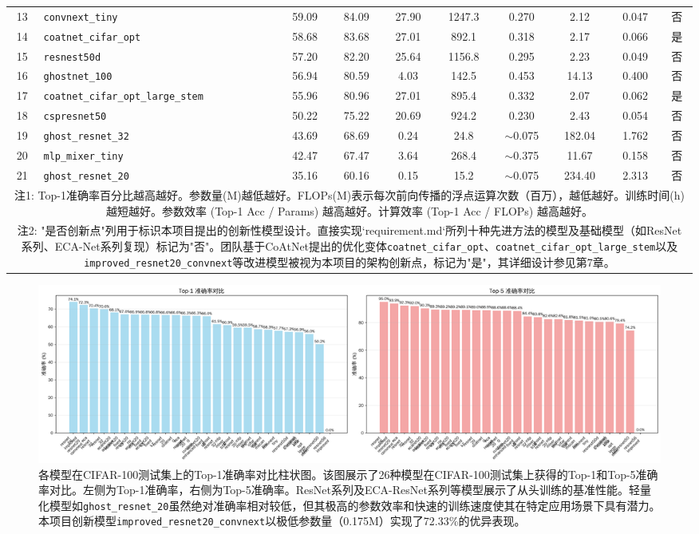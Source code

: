 \documentclass[a4paper]{article}
\begin{document}
\begin{description}
\begin{longtable}{clcccccccc}
13 & \texttt{convnext\_tiny} & 59.09 & 84.09 & 27.90 & 1247.3 & 0.270 & 2.12 & 0.047 & 否 \\
14 & \texttt{coatnet\_cifar\_opt} & 58.68 & 83.68 & 27.01 & 892.1 & 0.318 & 2.17 & 0.066 & 是 \\
15 & \texttt{resnest50d} & 57.20 & 82.20 & 25.64 & 1156.8 & 0.295 & 2.23 & 0.049 & 否 \\
16 & \texttt{ghostnet\_100} & 56.94 & 80.59 & 4.03 & 142.5 & 0.453 & 14.13 & 0.400 & 否 \\
17 & \texttt{coatnet\_cifar\_opt\_large\_stem} & 55.96 & 80.96 & 27.01 & 895.4 & 0.332 & 2.07 & 0.062 & 是 \\
18 & \texttt{cspresnet50} & 50.22 & 75.22 & 20.69 & 924.2 & 0.230 & 2.43 & 0.054 & 否 \\
19 & \texttt{ghost\_resnet\_32} & 43.69 & 68.69 & 0.24 & 24.8 & $\sim$0.075 & 182.04 & 1.762 & 否 \\
20 & \texttt{mlp\_mixer\_tiny} & 42.47 & 67.47 & 3.64 & 268.4 & $\sim$0.375 & 11.67 & 0.158 & 否 \\
21 & \texttt{ghost\_resnet\_20} & 35.16 & 60.16 & 0.15 & 15.2 & $\sim$0.075 & 234.40 & 2.313 & 否 \\
\multicolumn{10}{p{\dimexpr\linewidth-2\tabcolsep}}{\footnotesize 注1: Top-1准确率百分比越高越好。参数量(M)越低越好。FLOPs(M)表示每次前向传播的浮点运算次数（百万），越低越好。训练时间(h)越短越好。参数效率 (Top-1 Acc / Params) 越高越好。计算效率 (Top-1 Acc / FLOPs) 越高越好。} \\
\multicolumn{10}{p{\dimexpr\linewidth-2\tabcolsep}}{\footnotesize 注2: "是否创新点"列用于标识本项目提出的创新性模型设计。直接实现`requirement.md`所列十种先进方法的模型及基础模型（如ResNet系列、ECA-Net系列复现）标记为"否"。团队基于CoAtNet提出的优化变体\texttt{coatnet\_cifar\_opt}、\texttt{coatnet\_cifar\_opt\_large\_stem}以及\texttt{improved\_resnet20\_convnext}等改进模型被视为本项目的架构创新点，标记为"是"，其详细设计参见第7章。}
\end{longtable}

\begin{figure}[H]
    \centering
    \includegraphics[width=\textwidth]{accuracy_comparison.png}
    \caption{各模型在CIFAR-100测试集上的Top-1准确率对比柱状图。该图展示了26种模型在CIFAR-100测试集上获得的Top-1和Top-5准确率对比。左侧为Top-1准确率，右侧为Top-5准确率。ResNet系列及ECA-ResNet系列等模型展示了从头训练的基准性能。轻量化模型如\texttt{ghost\_resnet\_20}虽然绝对准确率相对较低，但其极高的参数效率和快速的训练速度使其在特定应用场景下具有潜力。本项目创新模型\texttt{improved\_resnet20\_convnext}以极低参数量（0.175M）实现了72.33\%的优异表现。}
    \label{fig:accuracy_comparison}
\end{figure}


\end{description}
\end{document}
